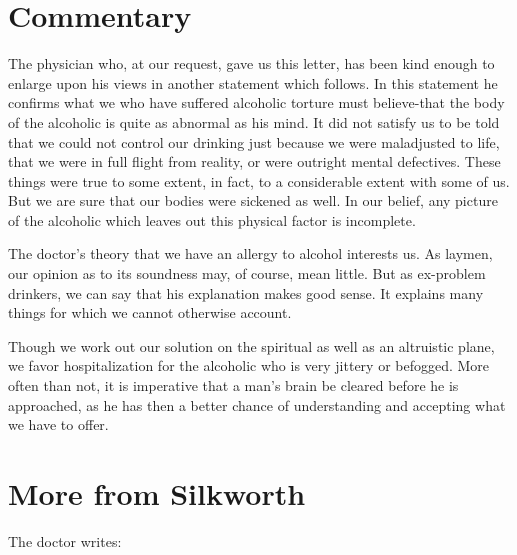 \section{Commentary}

The physician who, at our request, gave us this letter, has been kind enough to enlarge upon his views in another statement which follows. 
In this statement he confirms what we who have suffered alcoholic torture must believe-that the body of the alcoholic is quite as abnormal as his mind. 
It did not satisfy us to be told that we could not control our drinking just because we were maladjusted to life, that we were in full flight from reality, or were outright mental defectives. 
These things were true to some extent, in fact, to a considerable extent with some of us. 
But we are sure that our bodies were sickened as well. 
In our belief, any picture of the alcoholic which leaves out this physical factor is incomplete.

The doctor's theory that we have an allergy to alcohol interests us. 
As laymen, our opinion as to its soundness may, of course, mean little. 
But as ex-problem drinkers, we can say that his explanation makes good sense. 
It explains many things for which we cannot otherwise account.

Though we work out our solution on the spiritual as well as an altruistic plane, we favor hospitalization for the alcoholic who is very jittery or befogged. 
More often than not, it is imperative that a man's brain be cleared before he is approached, as he has then a better chance of understanding and accepting what we have to offer.

\section{More from Silkworth}

The doctor writes:

